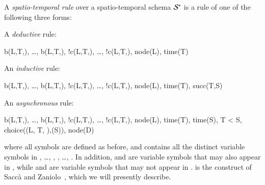 A {\em spatio-temporal rule} over a spatio-temporal schema $\stschema$ is a rule of one of the following three forms:


A {\em deductive} rule:

\begin{Drules}
        {b(L,T,), \ldots, b(L,T,), !c(L,T,), \ldots, !c(L,T,), node(L), time(T)}
\end{Drules}

An {\em inductive} rule:

\begin{Drules}
        {b(L,T,), \ldots, b(L,T,), !c(L,T,), \ldots, !c(L,T,), node(L), time(T), succ(T,S)}
\end{Drules}

%

An {\em asynchronous} rule:

\begin{Drules}
        {b(L,T,), \ldots, b(L,T,),
          !c(L,T,), \ldots, !c(L,T,),
          node(L), time(T), time(S), T < S, choice((L, T, ),(S)), node(D)}
\end{Drules}


where all symbols are defined as before, and  contains all the distinct
variable symbols in , \ldots, , , \ldots,
. In addition,  and  are variable symbols
that may also appear in , while  and  are variable
symbols that may not appear in .  is the construct of
Sacc\`{a} and Zaniolo~\cite{sacca-zaniolo}, which we will presently describe.

